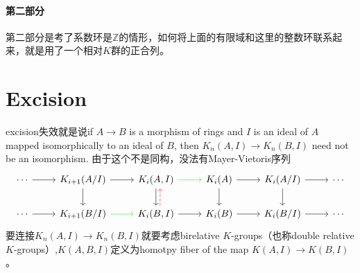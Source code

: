 \paragraph{第二部分} %
\label{par:第二部分}
第二部分是考了系数环是$\mathbb{Z}$的情形，如何将上面的有限域和这里的整数环联系起来，就是用了一个相对$K$群的正合列。




\section{Excision} %
\label{sec:excision}
excision失效就是说if $A \longrightarrow B$ is a morphism of rings and $I$ is an ideal of $A$ mapped isomorphically to an ideal of $B$,
then $K_n(A, I) \longrightarrow K_n(B, I)$ need not be an isomorphism. 由于这个不是同构，没法有Mayer-Vietoris序列
	\[\begin{tikzcd}
	\cdots \ar[r]&K_{i+1}(A/I) \ar[r] \ar[d]&	K_i(A,I) \ar[r,green] \ar[d]& K_i(A)\ar[r]\ar[d] & K_i(A/I)\ar[r] \ar[d] & \cdots\\
 \cdots \ar[r]&K_{i+1}(B/I) \ar[r,green] &	K_i(B,I) \ar[r] \ar[u, dashrightarrow, red, xshift=1ex] & K_i(B)\ar[r] & K_i(B/I)\ar[r] & \cdots
	\end{tikzcd}\]
要连接$K_n(A, I) \longrightarrow K_n(B, I)$就要考虑birelative $K$-groups（也称double relative $K$-groups）,$K(A,B,I)$定义为homotpy fiber of the map $K(A, I) \longrightarrow K(B, I)$。














